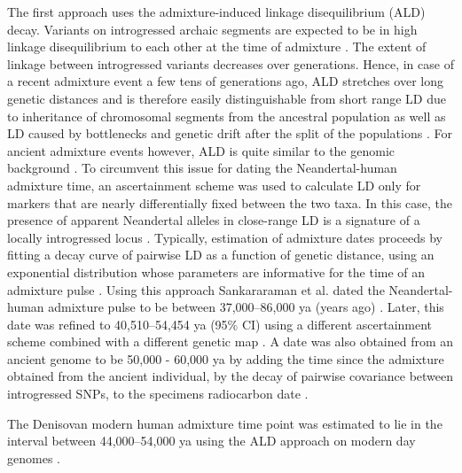 \documentclass[]{article}
\begin{document}
The first approach uses the admixture-induced linkage disequilibrium (ALD) decay. Variants on introgressed archaic segments are expected to be in high linkage disequilibrium to each other at the time of admixture \citep{chakraborty_admixture_1988,stephens_mapping_1994,wall_detecting_2000}. The extent of linkage between introgressed variants decreases over generations. Hence, in case of a recent admixture event a few tens of generations ago, ALD stretches  over long genetic distances
\citep{patterson_methods_2004} and is therefore easily distinguishable from short range LD due to inheritance of chromosomal segments from the ancestral population as well as LD caused by bottlenecks and genetic drift after the split of the populations \citep{moorjani_history_2011,sankararaman_date_2012}. For ancient admixture events however, ALD is quite similar to the genomic background \citep{sankararaman_date_2012}. To circumvent this issue for dating the Neandertal-human admixture time, an ascertainment scheme was used to calculate LD only for markers that are nearly differentially fixed between the two taxa. In this case, the presence of apparent Neandertal alleles in close-range LD is a signature of a locally introgressed locus
\citep{sankararaman_date_2012}. Typically, estimation of admixture dates proceeds by fitting a decay curve of pairwise LD as a function of genetic distance, using an exponential distribution whose parameters are informative for the time of an admixture pulse \citep{moorjani_history_2011,loh_inferring_2013}. Using this approach Sankararaman et al. dated the Neandertal-human admixture pulse to be  between 37,000--86,000 ya (years ago) \citep{sankararaman_date_2012}. Later, this date was refined to 40,510--54,454 ya (95\% CI) using a different ascertainment scheme combined with a different genetic map \citep{moorjani_genetic_2016}. A date was also obtained from an ancient genome to be 50,000 - 60,000 ya by adding the time since the admixture obtained from the ancient individual, by the decay of pairwise covariance between
introgressed SNPs, to the specimens radiocarbon date \citep{fu_genome_2014}.

The Denisovan modern human admixture time point was estimated to lie in the interval between 44,000--54,000 ya using the ALD
approach on modern day genomes \citep{sankararaman_combined_2016}. 
\end{document}
